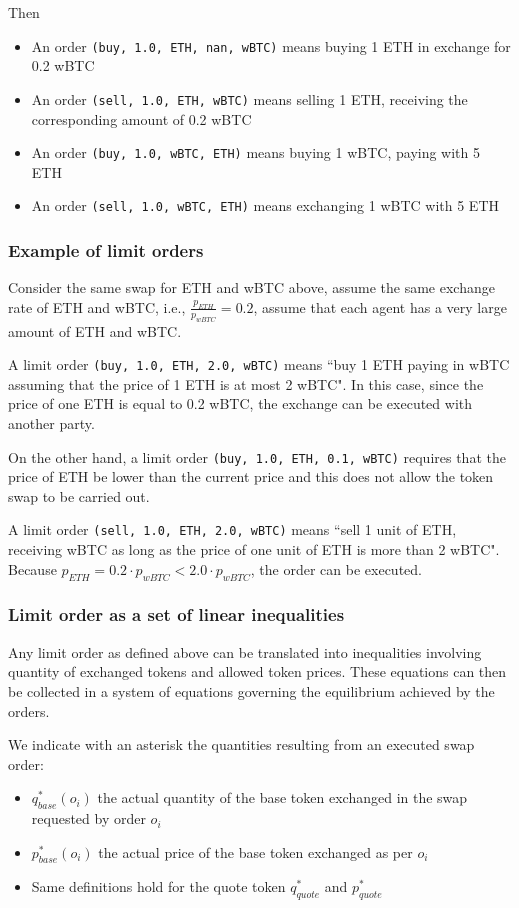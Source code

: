 \documentclass[11pt, reqno]{amsart}
\begin{document}
Then
\begin{itemize}
    \item An order \texttt{(buy, 1.0, ETH, nan, wBTC)} means buying 1 ETH in
      exchange for 0.2 wBTC
    \item An order \texttt{(sell, 1.0, ETH, wBTC)} means selling 1 ETH,
      receiving the corresponding amount of 0.2 wBTC
    \item An order \texttt{(buy, 1.0, wBTC, ETH)} means buying 1 wBTC, paying
      with 5 ETH
    \item An order \texttt{(sell, 1.0, wBTC, ETH)} means exchanging 1 wBTC with
      5 ETH
\end{itemize}

\subsubsection{Example of limit orders}
Consider the same swap for ETH and wBTC above, assume the same exchange rate
of ETH and wBTC, i.e., $\frac{p_{ETH}}{p_{wBTC}} = 0.2$, assume that each agent
has a very large amount of ETH and wBTC.

A limit order \texttt{(buy, 1.0, ETH, 2.0, wBTC)} means ``buy 1 ETH paying in wBTC
assuming that the price of 1 ETH is at most 2 wBTC". In this case, since the
price of one ETH is equal to 0.2 wBTC, the exchange can be executed with
another party.

On the other hand, a limit order \texttt{(buy, 1.0, ETH, 0.1, wBTC)} requires
that the price of ETH be lower than the current price and this does not allow
the token swap to be carried out.

A limit order \texttt{(sell, 1.0, ETH, 2.0, wBTC)} means ``sell 1 unit of ETH,
receiving wBTC as long as the price of one unit of ETH is more than 2 wBTC".
Because $p_{ETH} = 0.2 \cdot p_{wBTC} < 2.0 \cdot p_{wBTC}$, the order can be
executed.

\subsubsection{Limit order as a set of linear inequalities}
Any limit order as defined above can be translated into inequalities involving
quantity of exchanged tokens and allowed token prices. These equations can then
be collected in a system of equations governing the equilibrium achieved by the
orders.

We indicate with an asterisk the quantities resulting from an executed swap
order:
\begin{itemize}
  \item $q_{base}^*(o_i)$ the actual quantity of the base token exchanged in
    the swap requested by order $o_i$
  \item $p_{base}^*(o_i)$ the actual price of the base token exchanged as per
    $o_i$
  \item Same definitions hold for the quote token $q_{quote}^*$ and $p_{quote}^*$
\end{itemize}
\end{document}
